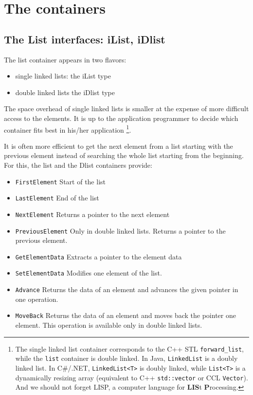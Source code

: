 \documentclass[12pt,a4paper,openany]{memoir} %
\newif\iftth
\newenvironment{ShorterItemize}{
\begin{itemize}
\iftth\else
  \setlength{\itemsep}{1pt}
  \setlength{\parskip}{0pt}
  \setlength{\parsep}{0pt}
\fi
}{\end{itemize}
}
\newcommand{\container}{}
\begin{document}
\chapter{The containers}
\renewcommand{\container}{List}
\section{The List interfaces: iList, iDlist}
The list container appears in two flavors: 
\begin{itemize}
\item
single linked lists: the iList type
\item
double linked lists the iDlist type
\end{itemize}
The space overhead of single linked lists is smaller at the expense of more difficult access to the elements. It is up to the application programmer to decide which container fits best in his/her application
\footnote{
The single linked list container corresponds to the C++ STL \texttt{forward\_list}, while the \texttt{list} container is double linked. In Java, \texttt{LinkedList} is a doubly linked list. In C\#/.NET, \texttt{LinkedList<T>} is doubly linked, while \texttt{List<T>} is a dynamically resizing array (equivalent to C++ \texttt{std::vector} or CCL \texttt{Vector}). And we should not forget LISP, a computer language for \textbf{LIS}t \textbf{P}rocessing.
}.

It is often more efficient to get the next element from a list starting with the previous element instead of searching the whole list starting from the beginning. For this, the list and the Dlist containers provide:
\begin{ShorterItemize}
\item \verb,FirstElement, Start of the list
\item \verb,LastElement, End of the list
\item \verb,NextElement, Returns a pointer to the next element
\item \verb,PreviousElement, Only in double linked lists. Returns a pointer to the previous element.
\item \verb,GetElementData, Extracts a pointer to the element data 
\item \verb,SetElementData, Modifies one element of the list.
\item \verb,Advance, Returns the data of an element and advances the given pointer in one operation.
\item \verb,MoveBack, Returns the data of an element and moves back the pointer one element. This operation is available only in double linked lists.
\end{ShorterItemize}
\end{document}
